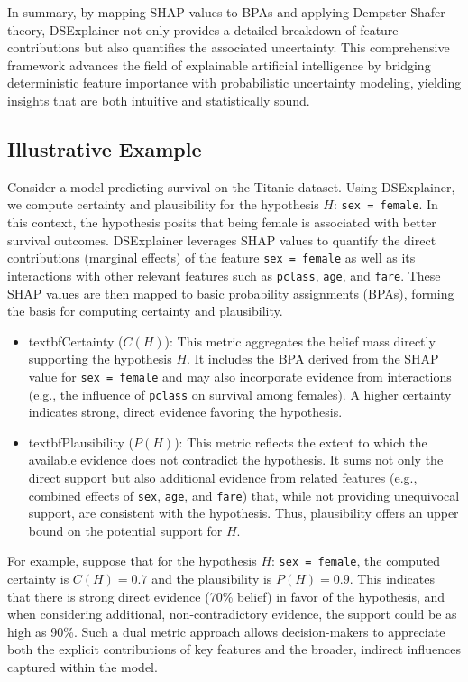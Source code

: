 \documentclass[acmlarge]{acmart}
\begin{document}
In summary, by mapping SHAP values to BPAs and applying Dempster-Shafer theory, DSExplainer not only provides a detailed breakdown of feature contributions but also quantifies the associated uncertainty. This comprehensive framework advances the field of explainable artificial intelligence by bridging deterministic feature importance with probabilistic uncertainty modeling, yielding insights that are both intuitive and statistically sound.


\subsection{Illustrative Example}

Consider a model predicting survival on the Titanic dataset. Using DSExplainer, we compute certainty and plausibility for the hypothesis \( H \): \texttt{sex = female}. In this context, the hypothesis posits that being female is associated with better survival outcomes. DSExplainer leverages SHAP values to quantify the direct contributions (marginal effects) of the feature \texttt{sex = female} as well as its interactions with other relevant features such as \texttt{pclass}, \texttt{age}, and \texttt{fare}. These SHAP values are then mapped to basic probability assignments (BPAs), forming the basis for computing certainty and plausibility.

\begin{itemize}
    \item textbf{Certainty (\( C(H) \))}: This metric aggregates the belief mass directly supporting the hypothesis \( H \). It includes the BPA derived from the SHAP value for \texttt{sex = female} and may also incorporate evidence from interactions (e.g., the influence of \texttt{pclass} on survival among females). A higher certainty indicates strong, direct evidence favoring the hypothesis.
    \item textbf{Plausibility (\( P(H) \))}: This metric reflects the extent to which the available evidence does not contradict the hypothesis. It sums not only the direct support but also additional evidence from related features (e.g., combined effects of \texttt{sex}, \texttt{age}, and \texttt{fare}) that, while not providing unequivocal support, are consistent with the hypothesis. Thus, plausibility offers an upper bound on the potential support for \( H \).
\end{itemize}

For example, suppose that for the hypothesis \( H \): \texttt{sex = female}, the computed certainty is \( C(H) = 0.7 \) and the plausibility is \( P(H) = 0.9 \). This indicates that there is strong direct evidence (70\% belief) in favor of the hypothesis, and when considering additional, non-contradictory evidence, the support could be as high as 90\%. Such a dual metric approach allows decision-makers to appreciate both the explicit contributions of key features and the broader, indirect influences captured within the model.
\end{document}
